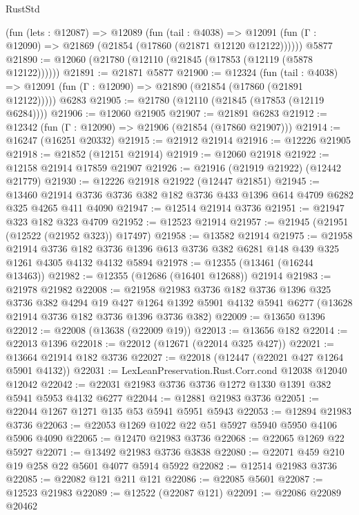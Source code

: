 \begin{lexlean}{RustStd}
\begin{coremodule}
    (fun (lets : @12087) =>
    @12089
      (fun (tail : @4038) =>
      @12091 (fun (Γ : @12090) => @21869 (@21854 (@17860 (@21871 @12120 @12122))))))
    @5877
@21890 := @12060 (@21780 (@12110 (@21845 (@17853 (@12119 (@5878 @12122))))))
@21891 := @21871 @5877
@21900 := @12324
    (fun (tail : @4038) => @12091 (fun (Γ : @12090) => @21890 (@21854 (@17860 (@21891 @12122)))))
    @6283
@21905 := @21780 (@12110 (@21845 (@17853 (@12119 @6284))))
@21906 := @12060 @21905
@21907 := @21891 @6283
@21912 := @12342 (fun (Γ : @12090) => @21906 (@21854 (@17860 @21907)))
@21914 := @16247 (@16251 @20332)
@21915 := @21912 @21914
@21916 := @12226 @21905
@21918 := @21852 (@12151 @21914)
@21919 := @12060 @21918
@21922 := @12158 @21914 @17859 @21907
@21926 := @21916 (@21919 @21922) (@12442 @21779)
@21930 := @12226 @21918 @21922 (@12447 @21851)
@21945 := @13460
    @21914
    @3736
    @3736
    @382
    @182
    @3736
    @433
    @1396
    @614
    @4709
    @6282
    @325
    @4265
    @411
    @4090
@21947 := @12514 @21914 @3736
@21951 := @21947 @323 @182 @323 @4709
@21952 := @12523 @21914
@21957 := @21945 (@21951 (@12522 (@21952 @323)) @17497)
@21958 := @13582 @21914
@21975 := @21958
    @21914
    @3736
    @182
    @3736
    @1396
    @613
    @3736
    @382
    @6281
    @148
    @439
    @325
    @1261
    @4305
    @4132
    @4132
    @5894
@21978 := @12355 (@13461 (@16244 @13463))
@21982 := @12355 (@12686 (@16401 @12688)) @21914
@21983 := @21978 @21982
@22008 := @21958
    @21983
    @3736
    @182
    @3736
    @1396
    @325
    @3736
    @382
    @4294
    @19
    @427
    @1264
    @1392
    @5901
    @4132
    @5941
    @6277
    (@13628 @21914 @3736 @182 @3736 @1396 @3736 @382)
@22009 := @13650 @1396
@22012 := @22008 (@13638 (@22009 @19))
@22013 := @13656 @182
@22014 := @22013 @1396
@22018 := @22012 (@12671 (@22014 @325 @427))
@22021 := @13664 @21914 @182 @3736
@22027 := @22018 (@12447 (@22021 @427 @1264 @5901 @4132))
@22031 := LexLeanPreservation.Rust.Corr.cond @12038 @12040 @12042
@22042 := @22031 @21983 @3736 @3736 @1272 @1330 @1391 @382 @5941 @5953 @4132 @6277
@22044 := @12881 @21983 @3736
@22051 := @22044 @1267 @1271 @135 @53 @5941 @5951 @5943
@22053 := @12894 @21983 @3736
@22063 := @22053 @1269 @1022 @22 @51 @5927 @5940 @5950 @4106 @5906 @4090
@22065 := @12470 @21983 @3736
@22068 := @22065 @1269 @22 @5927
@22071 := @13492 @21983 @3736 @3838
@22080 := @22071 @459 @210 @19 @258 @22 @5601 @4077 @5914 @5922
@22082 := @12514 @21983 @3736
@22085 := @22082 @121 @211 @121
@22086 := @22085 @5601
@22087 := @12523 @21983
@22089 := @12522 (@22087 @121)
@22091 := @22086 @22089 @20462

\end{coremodule}
\end{lexlean}
